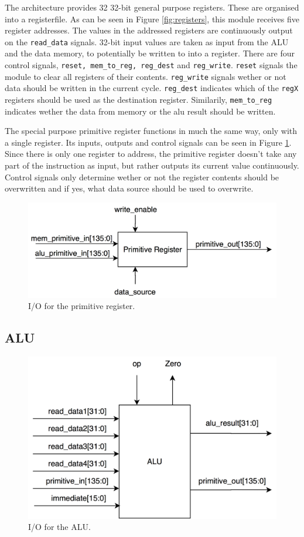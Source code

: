 The \vthreek architecture provides 32 32-bit general purpose registers.
These are organised into a registerfile.
As can be seen in Figure \ref{fig:registers}, this module receives five register addresses.
The values in the addressed registers are continuously output on the \texttt{read\_data} signals.
32-bit input values are taken as input from the ALU and the data memory, to potentially be written to into a register.
There are four control signals, \texttt{reset, mem\_to\_reg, reg\_dest} and \texttt{reg\_write}.
\texttt{reset} signals the module to clear all registers of their contents.
\texttt{reg\_write} signals wether or not data should be written in the current cycle.
\texttt{reg\_dest} indicates which of the \texttt{regX} registers should be used as the destination register.
Similarily, \texttt{mem\_to\_reg} indicates wether the data from memory or the alu result should be written.

The special purpose primitive register functions in much the same way, only with a single register.
Its inputs, outputs and control signals can be seen in Figure \ref{fig:primitive-register}.
Since there is only one register to address, the primitive register doesn't take any part of the instruction as input, but rather outputs its current value continuously.
Control signals only determine wether or not the register contents should be overwritten and if yes, what data source should be used to overwrite.

\begin{figure}[h!]
    \centering
    \includegraphics[width=0.6\linewidth]{images/primitive-register.png}
    \caption{I/O for the primitive register.}
    \label{fig:primitive-register}
\end{figure}

\subsection{ALU}

\begin{figure}[h!]
    \centering
    \includegraphics[width=0.8\linewidth]{images/ALU.png}
    \caption{I/O for the ALU.}
    \label{fig:ALU}
\end{figure}


